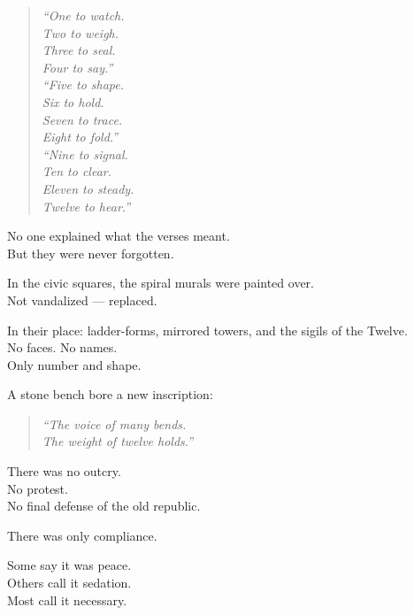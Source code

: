 \documentclass[12pt]{article}
\begin{document}
\begin{quote}
\textit{“One to watch.}\\
\textit{Two to weigh.}\\
\textit{Three to seal.}\\
\textit{Four to say.”}\\

\textit{“Five to shape.}\\
\textit{Six to hold.}\\
\textit{Seven to trace.}\\
\textit{Eight to fold.”}\\

\textit{“Nine to signal.}\\
\textit{Ten to clear.}\\
\textit{Eleven to steady.}\\
\textit{Twelve to hear.”}
\end{quote}

No one explained what the verses meant.\\
But they were never forgotten.

\vspace{1em}

In the civic squares, the spiral murals were painted over.\\
Not vandalized — replaced.

In their place: ladder-forms, mirrored towers, and the sigils of the Twelve.\\
No faces. No names.\\
Only number and shape.

A stone bench bore a new inscription:

\begin{quote}
\textit{“The voice of many bends.}\\
\textit{The weight of twelve holds.”}
\end{quote}

\vspace{1em}

There was no outcry.\\
No protest.\\
No final defense of the old republic.

There was only compliance.

Some say it was peace.\\
Others call it sedation.\\
Most call it necessary.

\vspace{1em}
\end{document}
